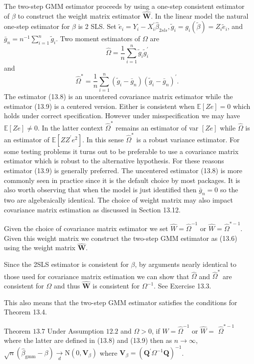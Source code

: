\documentclass[10pt]{article}
\begin{document}
The two-step GMM estimator proceeds by using a one-step consistent estimator of $\beta$ to construct the weight matrix estimator $\widehat{\boldsymbol{W}}$. In the linear model the natural one-step estimator for $\beta$ is 2 SLS. Set $\widetilde{e}_{i}=Y_{i}-X_{i}^{\prime} \widehat{\beta}_{2 s l s}, \widetilde{g}_{i}=g_{i}(\widetilde{\beta})=Z_{i} \widetilde{e}_{i}$, and $\bar{g}_{n}=n^{-1} \sum_{i=1}^{n} \widetilde{g}_{i}$. Two moment estimators of $\Omega$ are
$$
\widehat{\Omega}=\frac{1}{n} \sum_{i=1}^{n} \widetilde{g}_{i} \widetilde{g}_{i}^{\prime}
$$
and
$$
\widehat{\Omega}^{*}=\frac{1}{n} \sum_{i=1}^{n}\left(\widetilde{g}_{i}-\bar{g}_{n}\right)\left(\widetilde{g}_{i}-\bar{g}_{n}\right)^{\prime} .
$$
The estimator (13.8) is an uncentered covariance matrix estimator while the estimator (13.9) is a centered version. Either is consistent when $\mathbb{E}[Z e]=0$ which holds under correct specification. However under misspecification we may have $\mathbb{E}[Z e] \neq 0$. In the latter context $\widehat{\Omega}^{*}$ remains an estimator of var $[Z e]$ while $\widehat{\Omega}$ is an estimator of $\mathbb{E}\left[Z Z^{\prime} e^{2}\right]$. In this sense $\widehat{\Omega}^{*}$ is a robust variance estimator. For some testing problems it turns out to be preferable to use a covariance matrix estimator which is robust to the alternative hypothesis. For these reasons estimator (13.9) is generally preferred. The uncentered estimator (13.8) is more commonly seen in practice since it is the default choice by most packages. It is also worth observing that when the model is just identified then $\bar{g}_{n}=0$ so the two are algebraically identical. The choice of weight matrix may also impact covariance matrix estimation as discussed in Section 13.12.

Given the choice of covariance matrix estimator we set $\widehat{W}=\widehat{\Omega}^{-1}$ or $\widehat{W}=\widehat{\Omega}^{*-1}$. Given this weight matrix we construct the two-step GMM estimator as (13.6) using the weight matrix $\widehat{\boldsymbol{W}}$.

Since the 2SLS estimator is consistent for $\beta$, by arguments nearly identical to those used for covariance matrix estimation we can show that $\widehat{\Omega}$ and $\widehat{\Omega}^{*}$ are consistent for $\Omega$ and thus $\widehat{\boldsymbol{W}}$ is consistent for $\Omega^{-1}$. See Exercise 13.3.

This also means that the two-step GMM estimator satisfies the conditions for Theorem 13.4.

Theorem $13.7$ Under Assumption $12.2$ and $\Omega>0$, if $\widehat{W}=\widehat{\Omega}^{-1}$ or $\widehat{W}=$ $\widehat{\Omega}^{*-1}$ where the latter are defined in (13.8) and (13.9) then as $n \rightarrow \infty$, $\sqrt{n}\left(\widehat{\beta}_{\mathrm{gmm}}-\beta\right) \underset{d}{\longrightarrow} \mathrm{N}\left(0, \boldsymbol{V}_{\beta}\right)$ where $\boldsymbol{V}_{\beta}=\left(\boldsymbol{Q}^{\prime} \Omega^{-1} \boldsymbol{Q}\right)^{-1}$.
\end{document}
